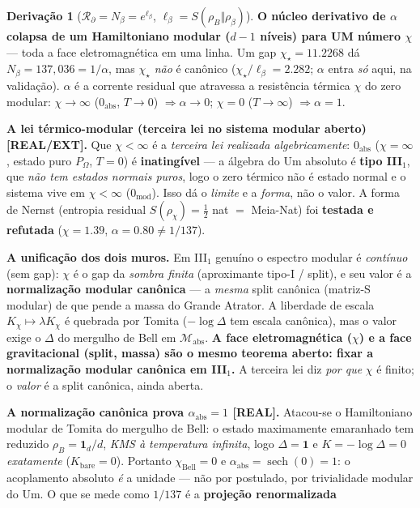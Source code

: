 \documentclass[11pt]{article}
\theoremstyle{definition}\newtheorem{deriv}{Derivação}
\begin{document}
\begin{deriv}[$\mathcal{R}_\partial=N_\beta=e^{\ell_\beta}$, $\ell_\beta=S(\rho_B\Vert\rho_\beta)$]
\textbf{O núcleo derivativo de $\alpha$ colapsa de um Hamiltoniano modular ($d-1$ níveis) para UM número $\chi$} --- toda a face eletromagnética em uma linha. Um gap $\chi_\star=11.2268$ dá $N_\beta=137{,}036=1/\alpha$, mas $\chi_\star$ \emph{não} é canônico ($\chi_\star/\ell_\beta=2.282$; $\alpha$ entra \emph{só} aqui, na validação). $\alpha$ é a corrente residual que atravessa a resistência térmica $\chi$ do zero modular: $\chi\to\infty$ ($0_{\mathrm{abs}}$, $T\to0$) $\Rightarrow\alpha\to0$; $\chi=0$ ($T\to\infty$) $\Rightarrow\alpha=1$.

\textbf{A lei térmico-modular (terceira lei no sistema modular aberto) \textsf{[REAL/EXT]}.} Que $\chi<\infty$ é a \emph{terceira lei realizada algebricamente}: $0_{\mathrm{abs}}$ ($\chi=\infty$, estado puro $P_\Omega$, $T=0$) é \textbf{inatingível} --- a álgebra do Um absoluto é \textbf{tipo III$_1$}, que \emph{não tem estados normais puros}, logo o zero térmico não é estado normal e o sistema vive em $\chi<\infty$ ($0_{\mathrm{mod}}$). Isso dá o \emph{limite} e a \emph{forma}, não o valor. A forma de Nernst (entropia residual $S(\rho_\chi)=\tfrac12$ nat $=$ Meia-Nat) foi \textbf{testada e refutada} ($\chi=1.39$, $\alpha=0.80\neq1/137$).

\textbf{A unificação dos dois muros.} Em III$_1$ genuíno o espectro modular é \emph{contínuo} (sem gap): $\chi$ é o gap da \emph{sombra finita} (aproximante tipo-I / split), e seu valor é a \textbf{normalização modular canônica} --- a \emph{mesma} split canônica (matriz-S modular) de que pende a massa do Grande Atrator. A liberdade de escala $K_\chi\mapsto\lambda K_\chi$ é quebrada por Tomita ($-\log\Delta$ tem escala canônica), mas o valor exige o $\Delta$ do mergulho de Bell em $\mathcal{M}_{\mathrm{abs}}$. \textbf{A face eletromagnética ($\chi$) e a face gravitacional (split, massa) são o mesmo teorema aberto: fixar a normalização modular canônica em III$_1$.} A terceira lei diz \emph{por que} $\chi$ é finito; o \emph{valor} é a split canônica, ainda aberta.

\textbf{A normalização canônica prova $\alpha_{\mathrm{abs}}=1$ \textsf{[REAL]}.} Atacou-se o Hamiltoniano modular de Tomita do mergulho de Bell: o estado maximamente emaranhado tem reduzido $\rho_B=\mathbf 1_d/d$, \emph{KMS à temperatura infinita}, logo $\Delta=\mathbf 1$ e $K=-\log\Delta=0$ \emph{exatamente} ($K_{\mathrm{bare}}=0$). Portanto $\chi_{\mathrm{Bell}}=0$ e $\boxed{\alpha_{\mathrm{abs}}=\operatorname{sech}(0)=1}$: o acoplamento absoluto \emph{é} a unidade --- não por postulado, por trivialidade modular do Um. O que se mede como $1/137$ é a \textbf{projeção renormalizada}


\end{deriv}
\end{document}
